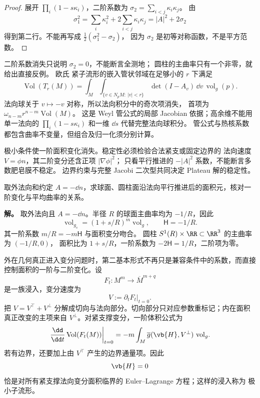 \begin{proof}
展开 $\prod_i(1-s\kappa_i)$，二阶系数为
$\sigma_2=\sum_{i<j}\kappa_i\kappa_j$。
由
\[
\sigma_1^2=\sum_i\kappa_i^2+2\sum_{i<j}\kappa_i\kappa_j
=|A|^2+2\sigma_2
\]
得到第二行。不能再写成 $\tfrac12(\sigma_1^2-\sigma_2)$，
因为 $\sigma_2$ 是初等对称函数，不是平方范数。
\end{proof}

\begin{note}
二阶系数消失只说明 $\sigma_2=0$，不能断言全测地；
圆柱的主曲率只有一个非零，就给出直接反例。
欧氏 紧子流形的嵌入管状邻域在足够小的 $r$ 下满足
\[
\operatorname{Vol}(T_r(M))
=\int_M\int_{\{v\in N_pM:\ |v|<r\}}
\det(I-A_v)\,\dd v\,\operatorname{vol}_g(p).
\]
法向球关于 $v\mapsto-v$ 对称，所以法向积分中的奇次项消失，
首项为 $\omega_{n-m}r^{n-m}\operatorname{Vol}(M)$。
这是 Weyl 管公式的局部 Jacobian 依据；高余维不能用单一法向的
$\prod_i(1-s\kappa_i)$ 和一维 $\dd s$ 代替完整法向球积分。
管公式与热核系数都包含曲率不变量，但组合及归一化须分别计算。

极小条件使一阶面积变化消失。稳定性必须检验合法紧支或固定边界的
法向速度 $V=\phi n$，其二阶变分还含正项 $|\nabla\phi|^2$；
只看平行推进的 $-|A|^2$ 系数，不能断言多数肥皂膜不稳定。
边界约束与完整 Jacobi 二次型共同决定 Plateau 解的稳定性。
\end{note}

\begin{exbox}[球面与圆柱的外法向平行推进]
取外法向和约定 $A=-\dd n$，求球面、圆柱面沿法向平行推进后的面积元，核对一阶变化与平均曲率的关系。

\textbf{解。} 取外法向且 $A=-\dd n$。半径 $R$ 的球面主曲率均为 $-1/R$，因此
\[
\operatorname{vol}_{g_s}=(1+s/R)^m\operatorname{vol}_g,
\qquad\mathsf H=-1/R.
\]
其一阶系数 $m/R=-m\mathsf H$ 与面积变分吻合。
圆柱 $S^1(R)\times\RR\subset\RR^3$ 的主曲率为 $(-1/R,0)$，
面积比为 $1+s/R$，一阶系数为 $-2\mathsf H=1/R$，二阶项为零。
\end{exbox}

外在几何真正进入变分问题时，第二基本形式不再只是兼容条件中的系数，而直接控制面积的一阶与二阶变化。设
\[
F_t:M^m\to\overline M^{m+q}
\]
是一族浸入，变分速度为
\[
V:=\partial_tF_t|_{t=0}.
\]
把 $V=V^\top+V^\perp$ 分解成切向与法向部分。切向部分只对应参数重标记；内在面积真正改变的主项来自 $V^\perp$。对紧支撑变分，一阶体积公式为
\begin{equation}
{
\left.\frac{\dd}{\dd t}\operatorname{Vol}(F_t(M))\right|_{t=0}
=-m\int_M
\overline g(\vb{H},V^\perp)\,\operatorname{vol}_g
}.
\label{eq:math-dg-first-variation-submanifold-volume}
\end{equation}
若有边界，还要加上由 $V^\top$ 产生的边界通量项。因此
\[
{\vb{H}=0}
\]
恰是对所有紧支撑法向变分面积临界的 Euler--Lagrange 方程；这样的浸入称为 极小子流形。

